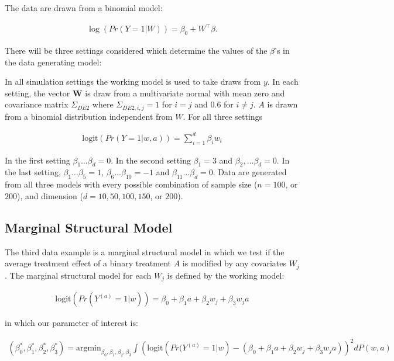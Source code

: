 \documentclass{article}
\begin{document}
The data are drawn from a binomial model:

\begin{align*}
    \log(Pr(Y = 1 | W)) = \beta_0 + W^\top \beta.
\end{align*}

There will be three settings considered which determine  the values of the $\beta$'s in the data generating model:

In all simulation settings the working model is used to take draws from $y$. In each setting, the vector $\boldsymbol{W}$ is draw from a multivariate normal with mean zero and covariance matrix $\Sigma_{DE2}$ where $\Sigma_{DE2, i, j} = 1$ for $i = j$ and $0.6$ for $i \neq j$.  $A$ is drawn from a binomial distribution independent from $W$.  For all three settings 

\begin{align*}
	\text{logit}\left(Pr(Y = 1 | w, a)\right) = \sum_{i = 1}^{d} \beta_{i} w_i
\end{align*}

In the first setting $\beta_1 \dots \beta_d = 0$.  In the second setting $\beta_1 = 3$ and $\beta_2, \dots \beta_d = 0$.  In the last setting, $\beta_1 \dots \beta_5 = 1$, $\beta_6 \dots \beta_{10} = -1$ and $\beta_{11} \dots \beta_d = 0$.  Data are generated from all three models with every possible combination of sample size ($n = 100$, or $200$), and dimension ($d = 10, 50, 100, 150$, or $200$).

\subsection{Marginal Structural Model}
The third data example is a marginal structural model in which we test if the average treatment effect of a binary treatment $A$ is modified by any covariates $W_j$.  The marginal structural model for each $W_j$ is defined by the working model:

\begin{align*}
\text{logit}\left(Pr(Y^{(a)} = 1 | w)\right) = \beta_0 + \beta_1 a + \beta_2 w_j + \beta_3 w_j a
\end{align*}

in which our parameter of interest is:

\begin{align*}
(\beta_0^*, \beta_1^*, \beta_2^*, \beta_3^*) = \text{argmin}_{\beta_0, \beta_1, \beta_2, \beta_3}\int\left(\text{logit}\left(Pr(Y^{(a)} = 1 | w\right) - (\beta_0 + \beta_1 a + \beta_2w_j + \beta_3 w_j a) \right)^2 dP(w, a)
\end{align*}
\end{document}

